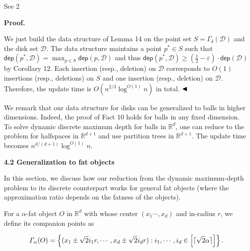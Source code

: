 See 2
\par
\par
\par\medskip\noindent\textbf{Proof.}\par
We just build the data structure of Lemma 14 on the point set $S=\varGamma_{\delta}(\mathcal{D})$ and the disk set $\mathcal{D}$. The data structure maintains a point $p^{*}\in S$ such that $\mathsf{dep}(p^{*},\mathcal{D})=\max_{p\in S}\mathsf{dep}(p,\mathcal{D})$ and thus $\mathsf{dep}(p^{*},\mathcal{D})\geq(\frac{1}{2}-\varepsilon)\cdot\mathsf{dep}(%
\mathcal{D})$ by Corollary 12. Each insertion (resp., deletion) on $\mathcal{D}$ corresponds to $O(1)$ insertions (resp., deletions) on $S$ and one insertion (resp., deletion) on $\mathcal{D}$. Therefore, the update time is $O(n^{2/3}\log^{O(1)}{n})$ in total. $\hfill\blacktriangleleft$
\par
\par
We remark that our data structure for disks can be generalized to balls in higher dimensions. Indeed, the proof of Fact 10 holds for balls in any fixed dimension. To solve dynamic discrete maximum depth for balls in $\mathbb{R}^{d}$, one can reduce to the problem for halfspaces in $\mathbb{R}^{d+1}$ and use partition trees in $\mathbb{R}^{d+1}$. The update time becomes $n^{d/(d+1)}\log^{O(1)}n$.
\par
\par
\par\medskip\noindent\textbf{4.2 Generalization to fat objects}\par
In this section, we discuss how our reduction from the dynamic maximum-depth problem to its discrete counterpart works for general fat objects (where the approximation ratio depends on the fatness of the objects).
\par
\par
For a $\alpha$-fat object $O$ in $\mathbb{R}^{d}$ with whose center $(x_{1}\cdots,x_{d})$ and in-radius $r$, we define its companion points as
\par
\[\begin{aligned}
\varGamma_{\alpha}(O)=\left\{(x_{1}\pm\sqrt{2}i_{1}r,\cdots,x_{d}\pm\sqrt{2}i_%
{d}r):i_{1},\cdots,i_{d}\in\left[\lceil\sqrt{2}\alpha\rceil\right]\right\}.
\end{aligned}\]
